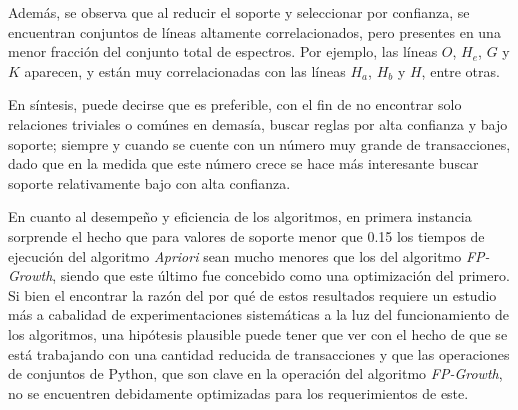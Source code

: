 Además, se observa que al reducir el soporte y seleccionar por confianza, se encuentran conjuntos de líneas altamente correlacionados, pero presentes en una menor fracción del conjunto total de espectros. Por ejemplo, las líneas $O$, $H_e$, $G$ y $K$ aparecen, y están muy correlacionadas con las líneas $H_a$, $H_b$ y $H$, entre otras.

En síntesis, puede decirse que es preferible, con el fin de no encontrar solo relaciones triviales o comúnes en demasía, buscar reglas por alta confianza y bajo soporte; siempre y cuando se cuente con un número muy grande de transacciones, dado que en la medida que este número crece se hace más interesante buscar soporte relativamente bajo con alta confianza.

En cuanto al desempeño y eficiencia de los algoritmos, en primera instancia sorprende el hecho que para valores de soporte menor que 0.15 los tiempos de ejecución del algoritmo \textit{Apriori} sean mucho menores que los del algoritmo \textit{FP-Growth}, siendo que este último fue concebido como una optimización del primero. Si bien el encontrar la razón del por qué de estos resultados requiere un estudio más a cabalidad de experimentaciones sistemáticas a la luz del funcionamiento de los algoritmos, una hipótesis plausible puede tener que ver con el hecho de que se está trabajando con una cantidad reducida de transacciones y que las operaciones de conjuntos de Python, que son clave en la operación del algoritmo \textit{FP-Growth}, no se encuentren debidamente optimizadas para los requerimientos de este.
